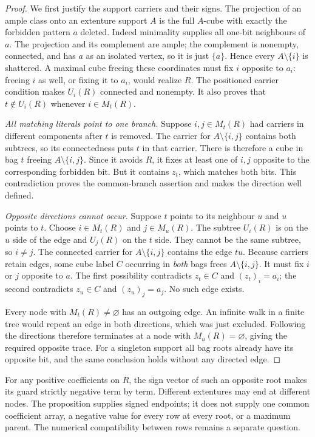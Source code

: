 \begin{proof}
We first justify the support carriers and their signs. The projection of
an ample class onto an extenture support $A$ is the full $A$-cube with
exactly the forbidden pattern $a$ deleted. Indeed minimality supplies all
one-bit neighbours of $a$. The projection and its complement are ample;
the complement is nonempty, connected, and has $a$ as an isolated vertex,
so it is just $\{a\}$. Hence every $A\setminus\{i\}$ is shattered.
A maximal cube freeing these coordinates must fix $i$ opposite to $a_i$:
freeing $i$ as well, or fixing it to $a_i$, would realize $R$.
The positioned carrier condition makes $U_i(R)$ connected and nonempty.
It also proves that $t\notin U_i(R)$ whenever $i\in M_t(R)$.

\emph{All matching literals point to one branch.}
Suppose $i,j\in M_t(R)$ had carriers in different components after $t$
is removed. The carrier for $A\setminus\{i,j\}$ contains both subtrees,
so its connectedness puts $t$ in that carrier. There is therefore a cube
in bag $t$ freeing $A\setminus\{i,j\}$. Since it avoids $R$, it fixes
at least one of $i,j$ opposite to the corresponding forbidden bit.
But it contains $z_t$, which matches both bits. This contradiction proves
the common-branch assertion and makes the direction well defined.

\emph{Opposite directions cannot occur.}
Suppose $t$ points to its neighbour $u$ and $u$ points to $t$. Choose
$i\in M_t(R)$ and $j\in M_u(R)$. The subtree $U_i(R)$ is on the $u$
side of the edge and $U_j(R)$ on the $t$ side. They cannot be the same
subtree, so $i\ne j$. The connected carrier for $A\setminus\{i,j\}$
contains the edge $tu$. Because carriers retain edges, some cube label
$C$ occurring in \emph{both} bags frees $A\setminus\{i,j\}$.
It must fix $i$ or $j$ opposite to $a$. The first possibility contradicts
$z_t\in C$ and $(z_t)_i=a_i$; the second contradicts $z_u\in C$ and
$(z_u)_j=a_j$. No such edge exists.

Every node with $M_t(R)\ne\varnothing$ has an outgoing edge. An infinite
walk in a finite tree would repeat an edge in both directions, which was
just excluded. Following the directions therefore terminates at a node
with $M_u(R)=\varnothing$, giving the required opposite trace. For a
singleton support all bag roots already have its opposite bit, and the
same conclusion holds without any directed edge.
\end{proof}

For any positive coefficients on $R$, the sign vector of such an opposite
root makes its guard strictly negative term by term. Different extentures
may end at different nodes. The proposition supplies signed endpoints;
it does not supply one common coefficient array, a negative value for every
row at every root, or a maximum parent. The numerical compatibility between
rows remains a separate question.

